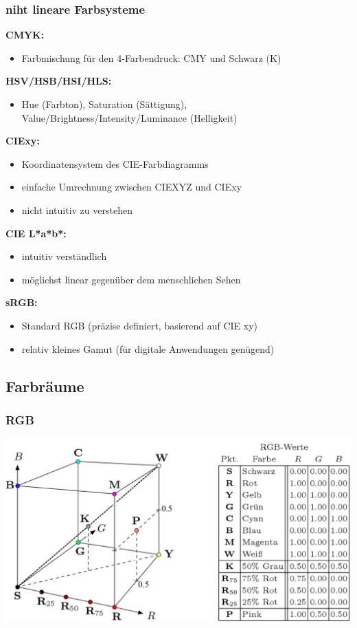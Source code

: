 \documentclass[10pt]{article}
\begin{document}
\subsubsection{niht lineare Farbsysteme}
\textbf{CMYK:}
\begin{itemize}
	\item Farbmischung für den 4-Farbendruck: CMY und Schwarz (K)
\end{itemize}
\textbf{HSV/HSB/HSI/HLS:}
\begin{itemize}
	\item Hue (Farbton), Saturation (Sättigung), Value/Brightness/Intensity/Luminance (Helligkeit)
\end{itemize}
\textbf{CIExy:}
\begin{itemize}
	\item Koordinatensystem des CIE-Farbdiagramms
	\item einfache Umrechnung zwischen CIEXYZ und CIExy
	\item nicht intuitiv zu verstehen
\end{itemize}
\textbf{CIE L*a*b*:}
\begin{itemize}
	\item intuitiv verständlich
	\item möglichst linear gegenüber dem menschlichen Sehen
\end{itemize}
\textbf{sRGB:}
\begin{itemize}
	\item Standard RGB (präzise definiert, basierend auf CIE xy)
	\item relativ kleines Gamut (für digitale Anwendungen genügend)
\end{itemize}

\subsection{Farbräume}
\subsubsection{RGB}
\begin{center}
	\includegraphics[scale=0.2]{rgb.png}
\end{center}
\end{document}
